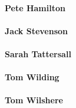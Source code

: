     \paragraph{Pete Hamilton}
    \paragraph{Jack Stevenson}
    \paragraph{Sarah Tattersall}
    \paragraph{Tom Wilding}
    \paragraph{Tom Wilshere}
